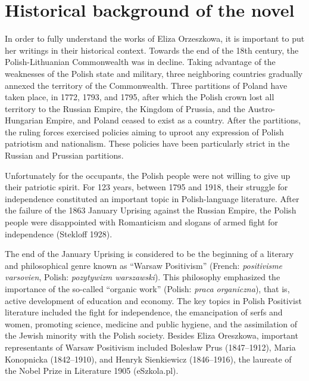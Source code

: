 \section{Historical background of the novel}

In order to fully understand the works of Eliza Orzeszkowa, it is important to put her writings in their historical context.
Towards the end of the 18th century, the Polish-Lithuanian Commonwealth was in decline.
Taking advantage of the weaknesses of the Polish state and military, three neighboring countries gradually annexed the territory of the Commonwealth.
Three partitions of Poland have taken place, in 1772, 1793, and 1795, after which the Polish crown lost all territory to the Russian Empire, the Kingdom of Prussia, and the Austro-Hungarian Empire, and Poland ceased to exist as a country.
After the partitions, the ruling forces exercised policies aiming to uproot any expression of Polish patriotism and nationalism.
These policies have been particularly strict in the Russian and Prussian partitions.

Unfortunately for the occupants, the Polish people were not willing to give up their patriotic spirit.
For 123 years, between 1795 and 1918, their struggle for independence constituted an important topic in Polish-language literature.
After the failure of the 1863 January Uprising against the Russian Empire, the Polish people were disappointed with Romanticism and slogans of armed fight for independence
(Stekloff 1928).

The end of the January Uprising is considered to be the beginning of a literary and philosophical genre known as ``Warsaw Positivism'' (French: \textit{positivisme varsovien}, Polish: \textit{pozytywizm warszawski}).
This philosophy emphasized the importance of the so-called ``organic work'' (Polish: \textit{praca organiczna}), that is, active development of education and economy.
The key topics in Polish Positivist literature included the fight for independence, the emancipation of serfs and women, promoting science, medicine and public hygiene, and the assimilation of the Jewish minority with the Polish society.
Besides Eliza Oreszkowa, important representants of Warsaw Positivism included Bolesław Prus (1847--1912), Maria Konopnicka (1842--1910), and Henryk Sienkiewicz (1846--1916), the laureate of the Nobel Prize in Literature 1905
(eSzkola.pl).

